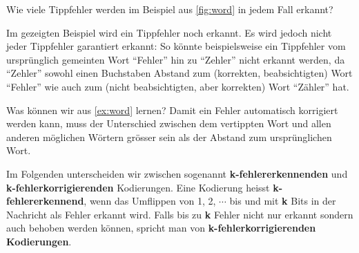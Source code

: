 \begin{myexample}\label{ex:word}
Wie viele Tippfehler werden im Beispiel aus \cref{fig:word} in jedem Fall erkannt?

Im gezeigten Beispiel wird ein Tippfehler noch erkannt. Es wird jedoch nicht jeder Tippfehler garantiert erkannt: So könnte beispielsweise ein Tippfehler vom ursprünglich gemeinten Wort \enquote{Fehler} hin zu \enquote{Zehler} nicht erkannt werden, da \enquote{Zehler} sowohl einen Buchstaben Abstand zum (korrekten, beabsichtigten) Wort \enquote{Fehler} wie auch zum (nicht beabsichtigten, aber korrekten) Wort \enquote{Zähler} hat. 
\end{myexample}

Was können wir aus \cref{ex:word} lernen? Damit ein Fehler automatisch korrigiert werden kann, muss der Unterschied zwischen dem vertippten Wort und allen anderen möglichen Wörtern grösser sein als der Abstand zum ursprünglichen Wort.

Im Folgenden unterscheiden wir zwischen sogenannt \textbf{k-fehlererkennenden} und \textbf{k-fehlerkorrigierenden} Kodierungen. Eine Kodierung heisst \textbf{k-fehlererkennend}, wenn das Umflippen von 1, 2, $\cdots$ bis und mit \textbf{k} Bits in der Nachricht als Fehler erkannt wird. Falls bis zu \textbf{k} Fehler nicht nur erkannt sondern auch behoben werden können, spricht man von \textbf{k-fehlerkorrigierenden Kodierungen}.

